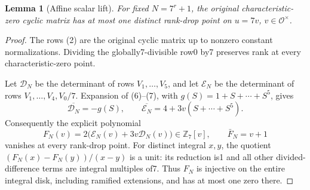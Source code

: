 \documentclass[11pt]{article}
\newtheorem{lemma}{Lemma}
\begin{document}
\begin{lemma}[Affine scalar lift]\label{lem:lift}
For fixed $N=7^r+1$, the original characteristic-zero cyclic
matrix has at most one distinct rank-drop point on $u=7v$,
$v\in\mathcal O^\times$.
\end{lemma}

\begin{proof}
The rows (2) are the original cyclic matrix up to nonzero constant
normalizations. Dividing the globally7-divisible row0 by7 preserves
rank at every characteristic-zero point.

Let $\mathcal D_N$ be the determinant of rows $V_1,\ldots,V_5$,
and let $\mathcal E_N$ be the determinant of rows
$V_1,\ldots,V_4,V_0/7$.
Expansion of (6)--(7), with $g(S)=1+S+\cdots+S^5$, gives
\[
 \overline{\mathcal D_N}=-g(S),\qquad
 \overline{\mathcal E_N}=4+3v(S+\cdots+S^5).
\]
Consequently the explicit polynomial
\[
 F_N(v)=2\bigl(\mathcal E_N(v)+3v\mathcal D_N(v)\bigr)
       \in\mathbb Z_7[v],\qquad \bar F_N=v+1              \tag{10}
\]
vanishes at every rank-drop point.
For distinct integral $x,y$, the quotient
$(F_N(x)-F_N(y))/(x-y)$ is a unit: its reduction is1
and all other divided-difference terms are integral multiples of7.
Thus $F_N$ is injective on the entire integral disk, including
ramified extensions, and has at most one zero there.
\end{proof}
\end{document}
